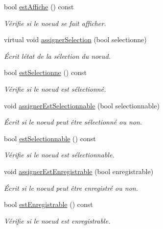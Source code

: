 \begin{DoxyCompactItemize}
bool \hyperlink{group__inf2990_ga07fc02e86d59ccd2680f9e5f5b8e373d}{est\+Affiche} () const 
\begin{DoxyCompactList}\small\item\em Vérifie si le noeud se fait afficher. \end{DoxyCompactList}\item 
virtual void \hyperlink{group__inf2990_ga0f39647390d357d8662a870f0c76242c}{assigner\+Selection} (bool selectionne)
\begin{DoxyCompactList}\small\item\em Écrit l\textquotesingle{}état de la sélection du noeud. \end{DoxyCompactList}\item 
bool \hyperlink{group__inf2990_ga8fb7a3313ce4d361ef7ec8e45ba8add5}{est\+Selectionne} () const 
\begin{DoxyCompactList}\small\item\em Vérifie si le noeud est sélectionné. \end{DoxyCompactList}\item 
void \hyperlink{group__inf2990_ga397add0bac7ec3b842598a2085990b7d}{assigner\+Est\+Selectionnable} (bool selectionnable)
\begin{DoxyCompactList}\small\item\em Écrit si le noeud peut être sélectionné ou non. \end{DoxyCompactList}\item 
bool \hyperlink{group__inf2990_gaa3f3a34571af62de0da5db2d8f54f690}{est\+Selectionnable} () const 
\begin{DoxyCompactList}\small\item\em Vérifie si le noeud est sélectionnable. \end{DoxyCompactList}\item 
void \hyperlink{group__inf2990_gabb7f3756a4094dc588690126ec0703d3}{assigner\+Est\+Enregistrable} (bool enregistrable)
\begin{DoxyCompactList}\small\item\em Écrit si le noeud peut être enregistré ou non. \end{DoxyCompactList}\item 
bool \hyperlink{group__inf2990_ga6a6af3639f1b4e3e33a126703376dcec}{est\+Enregistrable} () const 
\begin{DoxyCompactList}\small\item\em Vérifie si le noeud est enregistrable. \end{DoxyCompactList}\item 

\end{DoxyCompactItemize}
